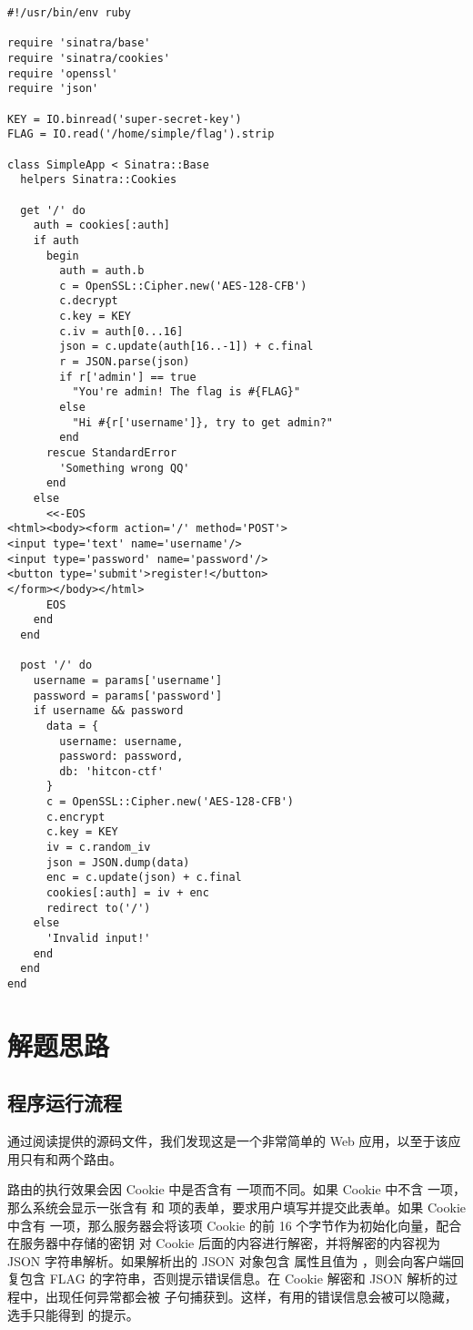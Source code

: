\documentclass[a4paper,UTF8]{ctexart}
\begin{document}
\begin{verbatim}
#!/usr/bin/env ruby

require 'sinatra/base'
require 'sinatra/cookies'
require 'openssl'
require 'json'

KEY = IO.binread('super-secret-key')
FLAG = IO.read('/home/simple/flag').strip

class SimpleApp < Sinatra::Base
  helpers Sinatra::Cookies

  get '/' do
    auth = cookies[:auth]
    if auth
      begin
        auth = auth.b
        c = OpenSSL::Cipher.new('AES-128-CFB')
        c.decrypt
        c.key = KEY
        c.iv = auth[0...16]
        json = c.update(auth[16..-1]) + c.final
        r = JSON.parse(json)
        if r['admin'] == true
          "You're admin! The flag is #{FLAG}"
        else
          "Hi #{r['username']}, try to get admin?"
        end
      rescue StandardError
        'Something wrong QQ'
      end
    else
      <<-EOS
<html><body><form action='/' method='POST'>
<input type='text' name='username'/>
<input type='password' name='password'/>
<button type='submit'>register!</button>
</form></body></html>
      EOS
    end
  end

  post '/' do
    username = params['username']
    password = params['password']
    if username && password
      data = {
        username: username,
        password: password,
        db: 'hitcon-ctf'
      }
      c = OpenSSL::Cipher.new('AES-128-CFB')
      c.encrypt
      c.key = KEY
      iv = c.random_iv
      json = JSON.dump(data)
      enc = c.update(json) + c.final
      cookies[:auth] = iv + enc
      redirect to('/')
    else
      'Invalid input!'
    end
  end
end
\end{verbatim}

\section{解题思路}

\subsection{程序运行流程}\label{program-workflow}

通过阅读提供的源码文件，我们发现这是一个非常简单的 Web 应用，以至于该应用只有和两个路由。

 路由的执行效果会因 Cookie 中是否含有  一项而不同。如果 Cookie 中不含  一项，那么系统会显示一张含有  和  项的表单，要求用户填写并提交此表单。如果 Cookie 中含有  一项，那么服务器会将该项 Cookie 的前 16 个字节作为初始化向量，配合在服务器中存储的密钥  对 Cookie 后面的内容进行解密，并将解密的内容视为 JSON 字符串解析。如果解析出的 JSON 对象包含  属性且值为  ，则会向客户端回复包含 FLAG 的字符串，否则提示错误信息。在 Cookie 解密和 JSON 解析的过程中，出现任何异常都会被  子句捕获到。这样，有用的错误信息会被可以隐藏，选手只能得到  的提示。
\end{document}
